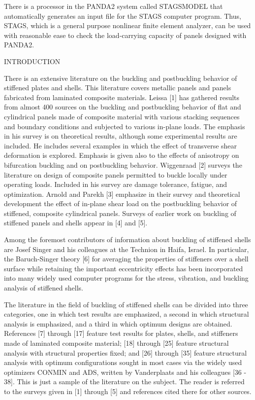 There is a processor in the PANDA2 system called STAGSMODEL that
automatically generates an input file for the STAGS computer program.
Thus, STAGS, which is a general purpose nonlinear finite element analyzer,
can be used with reasonable ease to check the load-carrying capacity of
panels designed with PANDA2. 


                     INTRODUCTION

There is an extensive literature on the buckling and postbuckling behavior
of stiffened plates and shells. This literature covers metallic panels and
panels fabricated from laminated composite materials.  Leissa [1] has
gathered results from almost 400 sources on the buckling and postbuckling
behavior of flat and cylindrical panels made of composite material with
various stacking sequences and boundary conditions and subjected to
various in-plane loads. The emphasis in his survey is on theoretical
results, although some experimental results are included. He includes
several examples in which the effect of transverse shear deformation is
explored. Emphasis is given also to the effects of anisotropy on
bifurcation buckling and on postbuckling behavior. Wiggenraad [2] surveys
the literature on design of composite panels permitted to buckle locally
under operating loads.  Included in his survey are damage tolerance,
fatigue, and optimization. Arnold and Parekh [3] emphasize in their survey
and theoretical development the effect of in-plane shear load on the
postbuckling behavior of stiffened, composite cylindrical panels. Surveys
of earlier work on buckling of stiffened panels and shells appear in [4]
and [5]. 

Among the foremost contributors of information about buckling of stiffened
shells are Josef Singer and his colleagues at the Technion in Haifa,
Israel. In particular, the Baruch-Singer theory [6] for averaging the
properties of stiffeners over a shell surface while retaining the
important eccentricity effects has been incorporated into many widely used
computer programs for the stress, vibration, and buckling analysis of
stiffened shells. 

The literature in the field of buckling of stiffened shells can be divided
into three categories, one in which test results are emphasized, a second
in which structural analysis is emphasized, and a third in which optimum
designs are obtained. References [7] through [17] feature test results for
plates, shells, and stiffeners made of laminated composite material; [18]
through [25] feature structural analysis with structural properties fixed;
and [26] through [35] feature structural analysis with optimum
configurations sought in most cases via the widely used optimizers CONMIN
and ADS, written by Vanderplaats and his colleagues [36 - 38].  This is
just a sample of the literature on the subject. The reader is referred to
the surveys given in [1] through [5] and references cited there for other
sources. 


